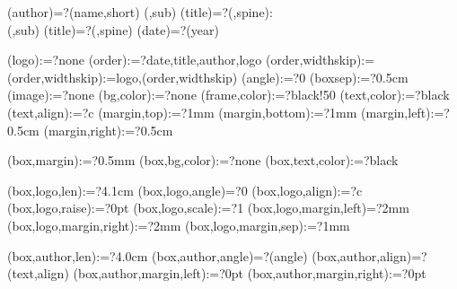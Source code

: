 
%


\makeatletter



\spine(author)=?{\thedocauthor(name,short)}
(\@LANG@COVER,sub){%
  \spine(title)=?{\thedoctitle(\@LANG@COVER,spine):\\\thedoctitle(\@LANG@COVER,sub)}
}{%
  \spine(title)=?{\thedoctitle(\@LANG@COVER,spine)}
}
\spine(date)=?{\thentdocdate(year)}


\spine(logo):=?{none}
\spine(order):=?{date,title,author,logo}
\spine(order,widthskip):={}
\spine(order,widthskip):={logo,\thespine(order,widthskip)}
\spine(angle):=?{0}
\spine(boxsep):=?{0.5cm}
\spine(image):=?{none}
\spine(bg,color):=?{none}
\spine(frame,color):=?{black!50}
\spine(text,color):=?{black}
\spine(text,align):=?{c}
\spine(margin,top):=?{1mm}
\spine(margin,bottom):=?{1mm}
\spine(margin,left):=?{0.5cm}
\spine(margin,right):=?{0.5cm}

\spine(box,margin):=?{0.5mm}
\spine(box,bg,color):=?{none}
\spine(box,text,color):=?{black}

\spine(box,logo,len):=?{4.1cm}
\spine(box,logo,angle)=?{0}
\spine(box,logo,align):=?{c}
\spine(box,logo,raise):=?{0pt}
\spine(box,logo,scale):=?{1}
\spine(box,logo,margin,left)=?{2mm}
\spine(box,logo,margin,right):=?{2mm}
\spine(box,logo,margin,sep):=?{1mm}

\spine(box,author,len):=?{4.0cm}
\spine(box,author,angle)=?{\thespine(angle)}
\spine(box,author,align)=?{\thespine(text,align)}
\spine(box,author,margin,left):=?{0pt}
\spine(box,author,margin,right):=?{0pt}

